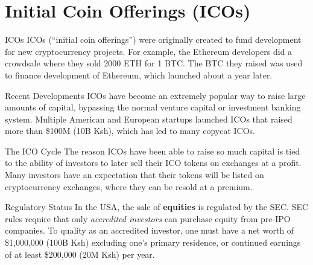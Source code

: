 \documentclass[14pt]{beamer}
\begin{document}
\section{Initial Coin Offerings (ICOs)}

\begin{frame}{ICOs}
  ICOs (``initial coin offerings'') were originally created to fund development
  for new cryptocurrency projects.
  \newline
  \newline
  For example, the Ethereum developers did a crowdsale where they sold 2000 ETH
  for 1 BTC.
  \newline
  \newline
  The BTC they raised was used to finance development of Ethereum,
  which launched about a year later.
\end{frame}

\begin{frame}{Recent Developments}
  ICOs have become an extremely popular way to raise large amounts of capital,
  bypassing the normal venture capital or investment banking system.
  \newline
  \newline
  Multiple American and European startups launched ICOs that raised more than
  \$100M (10B Ksh), which has led to many copycat ICOs.
\end{frame}

\begin{frame}{The ICO Cycle}
  The reason ICOs have been able to raise so much capital is tied to the ability
  of investors to later sell their ICO tokens on exchanges at a profit.
  \newline
  \newline
  Many investors have an expectation that their tokens will be listed on
  cryptocurrency exchanges, where they can be resold at a premium.
\end{frame}

\begin{frame}{Regulatory Status}
  In the USA, the sale of \textbf{equities} is regulated by the SEC. SEC rules
  require that only \emph{accredited investors} can purchase equity from pre-IPO
  companies.
  \newline
  \newline
  To quality as an accredited investor, one must have a net worth of \$1,000,000
  (100B Ksh) excluding one's primary residence, or continued earnings of at
  least \$200,000 (20M Ksh) per year.
\end{frame}
\end{document}
